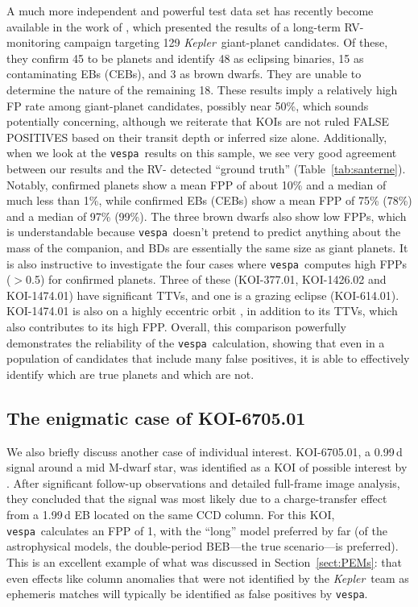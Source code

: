 \documentclass{emulateapj}
\newcommand{\Tab}[1]{Table~\ref{tab:#1}}
\newcommand{\sectionname}{Section}
\newcommand{\Sect}[1]{\sectionname~\ref{sect:#1}}
\newcommand{\sect}[1]{\Sect{#1}}
\newcommand{\sectlabel}[1]{\label{sect:#1}}
\newcommand{\kepler}{\textit{Kepler}}
\newcommand{\vespa}{\texttt{vespa}}
\begin{document}
A much more independent and powerful test data set has recently become
available in the work of \citet{Santerne:2015}, which presented the
results of a long-term RV-monitoring campaign targeting 129 \kepler\
giant-planet candidates.  Of these, they confirm 45 to be planets and
identify 48 as eclipsing binaries, 15 as contaminating EBs (CEBs), and
3 as brown dwarfs.  They are unable to determine the nature of the
remaining 18.  These results imply a relatively high FP rate among
giant-planet candidates, possibly near 50\%, which sounds potentially
concerning, although we reiterate that KOIs are not ruled FALSE 
POSITIVES based on their transit depth or inferred size alone.
Additionally, when we look at the \vespa\ results on this sample, we
see very good agreement between our results and the RV-
detected ``ground truth'' (\Tab{santerne}).  Notably, confirmed
planets show a mean FPP of about 10\% and a median of much less than 1\%,
while confirmed EBs (CEBs) show a mean FPP of 75\% (78\%) and a median
of 97\% (99\%).  The three brown dwarfs also show low FPPs, which is
understandable because \vespa\ doesn't pretend to predict anything
about the mass of the companion, and BDs are essentially the same size
as giant planets.  It is also instructive to investigate the four
cases where \vespa\ computes high FPPs ($>$0.5) for confirmed planets.
Three of these (KOI-377.01, KOI-1426.02 and KOI-1474.01) have
significant TTVs, and one is a grazing eclipse (KOI-614.01).
KOI-1474.01 is also on a highly eccentric orbit \citep{Dawson:2012},
in addition to its TTVs, which also contributes to its high FPP.
Overall, this comparison powerfully demonstrates the reliability of
the \vespa\ calculation, showing that even in a population of
candidates that include many false positives, it is able to
effectively identify which are true planets and which are not.

\subsection{The enigmatic case of KOI-6705.01}
\sectlabel{gaidos}

We also briefly discuss another case of individual interest.
KOI-6705.01, a 0.99\,d signal around a mid M-dwarf star, was
identified  as a KOI of possible interest by \citet{Gaidos:2015}.
After significant follow-up observations and detailed full-frame image
analysis, they concluded that the signal was most likely due to a
charge-transfer  effect from a 1.99\,d EB located on the same CCD
column.  For this KOI, \vespa\ calculates an FPP of 1, with the 
``long'' model preferred by far (of the astrophysical models, the 
double-period BEB---the true scenario---is preferred). This is an excellent
example of what was discussed in \sect{PEMs}: that even effects like
column anomalies that were not identified by the \kepler\ team as
ephemeris matches will typically be identified as false positives by 
\vespa.
\end{document}
